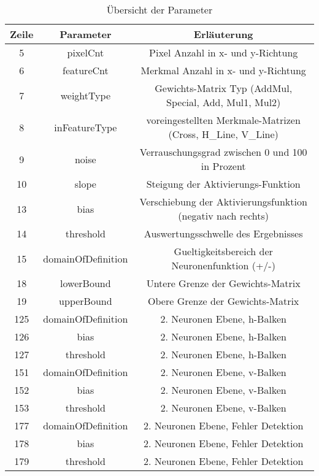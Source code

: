 \begin{table}[hbt]
	\centering
	\begin{tabular}{|c|c|c|}
		
		\hline 
		Zeile & Parameter & Erläuterung \\ 
		\hline 
		5 & pixelCnt & Pixel Anzahl in x- und y-Richtung \\ 
		\hline 
		6 & featureCnt & Merkmal Anzahl in x- und y-Richtung \\ 
		\hline 
		7 & weightType & Gewichts-Matrix Typ (AddMul, Special, Add, Mul1, Mul2) \\ 
		\hline 
		8 & inFeatureType & voreingestellten Merkmale-Matrizen (Cross, H\_Line, V\_Line) \\ 
		\hline 
		9 & noise & Verrauschungsgrad zwischen 0 und 100 in Prozent \\ 
		\hline 
		10 & slope & Steigung der Aktivierungs-Funktion \\ 
		\hline 
		13 & bias & Verschiebung der Aktivierungsfunktion (negativ nach rechts) \\ 
		\hline 
		14 & threshold & Auswertungsschwelle des Ergebnisses \\ 
		\hline 
		15 & domainOfDefinition & Gueltigkeitsbereich der Neuronenfunktion (+/-) \\ 
		\hline 
		18 & lowerBound & Untere Grenze der Gewichts-Matrix \\ 
		\hline 
		19 & upperBound & Obere Grenze der Gewichts-Matrix \\ 
		\hline 
		125 & domainOfDefinition & 2. Neuronen Ebene, h-Balken \\ 
		\hline
		126 & bias & 2. Neuronen Ebene, h-Balken \\ 
		\hline 
		127 & threshold & 2. Neuronen Ebene, h-Balken \\ 
		\hline 
		151 & domainOfDefinition & 2. Neuronen Ebene, v-Balken \\ 
		\hline
		152 & bias & 2. Neuronen Ebene, v-Balken \\ 
		\hline 
		153 & threshold & 2. Neuronen Ebene, v-Balken \\ 
		\hline 
		177 & domainOfDefinition & 2. Neuronen Ebene, Fehler Detektion \\ 
		\hline
		178 & bias & 2. Neuronen Ebene, Fehler Detektion \\ 
		\hline 
		179 & threshold & 2. Neuronen Ebene, Fehler Detektion \\ 
		\hline 
		
	\end{tabular}
	\caption{Übersicht der Parameter}
	
	\label{ueParameter}
\end{table}

